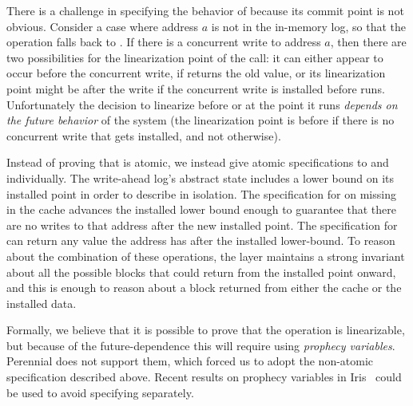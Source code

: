 There is a challenge in specifying the behavior of  because its commit
point is not obvious.  Consider a case
where address $a$ is not in the in-memory log, so that the  operation
falls back to . If there is a concurrent write to address
$a$, then there are two possibilities for the linearization point of the
 call: it can either appear to occur before the concurrent write, if
 returns the old value, or its linearization point might be
after the write if the concurrent write is installed before
 runs. Unfortunately the decision to linearize before
 or at the point it runs \emph{depends on the future
  behavior} of the system (the linearization point is before if there is no
concurrent write that gets installed, and not otherwise).

Instead of proving that  is atomic, we instead give atomic specifications to
 and  individually. The write-ahead log's
abstract state includes a lower bound on its installed point in order to
describe  in isolation. The specification for 
on missing in the cache
advances the installed lower bound enough to guarantee that there are no writes
to that address after the new installed point. The specification for
 can return any value the address has after the
installed lower-bound. To reason about the combination of these operations, the
 layer maintains a strong invariant about all the possible blocks that
 could return from the installed point onward, and this is enough to
reason about a block returned from either the cache or the installed data.

Formally, we believe that it is possible to prove that the  
operation is linearizable, but because of the future-dependence this
will require using \emph{prophecy variables}.  Perennial
does not support them, which forced us to adopt the non-atomic
specification described above.  Recent results on prophecy variables
in Iris~\cite{jung:prophecy} could be used to avoid specifying
 separately.
